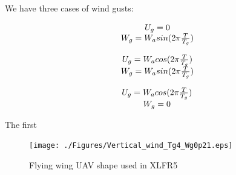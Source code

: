  \label{sec:results}


\par We have three cases of wind gusts:

\begin{equation}
	\begin{array}[c]{c}
		U_g=0 \\ 
		W_g= W_a sin(2 \pi \frac{T}{T_g})
	\end{array}
	\label{eqn:vertical_gust}
\end{equation}


\begin{equation}
	\begin{array}[c]{c}
		U_g= W_a cos(2 \pi \frac{T}{T_g}) \\
		W_g= W_a sin(2 \pi \frac{T}{T_g})
	\end{array}
	\label{eqn:compound_gust}
\end{equation}


\begin{equation}
	\begin{array}[c]{c}
		U_g= W_a cos( 2 \pi \frac{T}{T_g}) \\
		W_g= 0
	\end{array}
	\label{eqn:horizontal_gust}
\end{equation}

\par The first 



\begin{figure}[ht]
	\begin{center}
	{\texttt{[image: ./Figures/Vertical\_wind\_Tg4\_Wg0p21.eps]}}
	\end{center}
	\caption{Flying wing UAV shape used in XLFR5}
	\label{fig:deUAV}
\end{figure}

